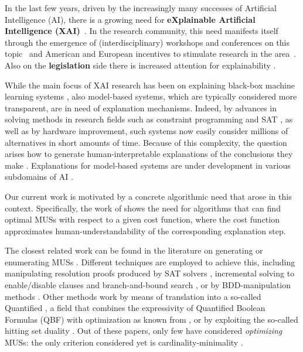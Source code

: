 
In the last few years, driven by the increasingly many successes of Artificial Intelligence (AI), there is a growing need for \textbf{eXplainable Artificial Intelligence (XAI)}~\cite{miller2019explanation}.
In the research community, this need manifests itself through the emergence of (interdisciplinary) workshops and conferences on this topic~\cite{xai-ijcai,FAT} and American and European incentives to stimulate research in the area~\cite{gunning2017explainable,hamonrobustness,chistera,fetproact}. 
Also on the \textbf{legislation} side there is increased attention for explainability \cite{regulation2016regulation}.

While the main focus of XAI research has been on explaining black-box machine learning systems \cite{Barredo_Arrieta_2020,Adadi_2018}, also model-based systems, which are typically considered more transparent, are in need of explanation mechanisms. 
Indeed, by advances in solving methods in research fields such as constraint programming \cite{CP} and SAT \cite{DBLP:series/faia/2009-185}, as well as by hardware improvement, such systems now easily consider millions of alternatives in short amounts of time. 
Because of this complexity, the question arises how to generate human-interpretable explanations of the conclusions they make  \cite{DBLP:conf/dsaa/GilpinBYBSK18}. 
Explanations for model-based systems are under development in various subdomains of AI \cite{junker2001quickxplain,fox2017explainable,vcyras2019argumentation,chakraborti2017plan,winston2004operations,putnam2019toward,janota2010sat}.

Our current work is motivated by a concrete algorithmic need that arose in this context. 
Specifically, the work of \citet{ecai/BogaertsGCG20} shows the need for algorithms that can find optimal MUSs with respect to a given cost function, where the cost function approximates human-understandability of the corresponding explanation step.

The closest related work can be found in the literature on generating or enumerating MUSs \cite{conf/sat/LynceM04}.
Different techniques are employed to achieve this, including  manipulating resolution proofs produced by SAT solvers \cite{goldberg,DBLP:journals/fmsd/GershmanKS08,DBLP:conf/sat/DershowitzHN06}, incremental solving to enable/disable clauses and branch-and-bound search \cite{DBLP:conf/dac/OhMASM04}, or by BDD-manipulation methods \cite{huang}.
Other methods work by means of translation into a so-called Quantified \maxsat \cite{DBLP:journals/constraints/IgnatievJM16}, a field that combines the expressivity of Quantified Boolean Formulas (QBF)  with optimization as known from \maxsat {}, or by exploiting the so-called hitting set duality \cite{ignatiev2015smallest}. 
Out of these papers, only few have considered \emph{optimizing} MUSs: the only criterion considered yet is cardinality-minimality \cite{conf/sat/LynceM04,ignatiev2015smallest}. 

